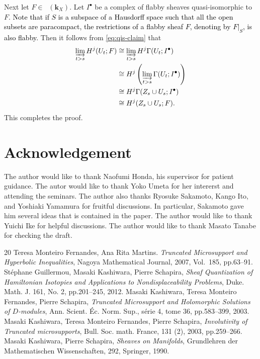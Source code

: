 ﻿\documentclass[a4paper,leqno,dvipdfmx]{jsarticle}
\makeatletter
\theoremstyle{definition}
\newcommand{\kk}{\mathbf{k}}
\renewenvironment{proof}[1][\proofname]{\par
  \pushQED{\qed}%
  \normalfont \topsep6\p@\@plus6\p@\relax
  \trivlist
  \item[\hskip\labelsep
         \bfseries
    {#1}]\ignorespaces
}{%
  \popQED\endtrivlist\@endpefalse
}
\renewcommand{\proofname}{Proof.}
\numberwithin{equation}{section}
\newcommand{\Dompl}{\mathop{\mathsf{D}^\mathrm{+}}\nolimits}
\newcommand{\indlim}[1][]{\mathop{\varinjlim}\limits_{#1}}
\newcommand{\mres}[2][]{{\left.{#1}\right\rvert}_{#2}}
\theoremstyle{mystyle}
\makeatother
\begin{document}
\begin{proof}[Proof of Lemma \ref{clm:ind-nonchar}]
  Next \textcolor{black}{l}et \(F\in\Dompl(\kk_X)\). 
  Let \(I^{\bm{\bullet}}\) be a complex of flabby sheaves 
  quasi-isomorphic to \(F\). 
  \textcolor{black}{Note that 
  if \(S\) is a subspace of a Hausdorff space such that 
  all the open subsets are paracompact, 
  the restrictions of a flabby sheaf \(F\), 
  denoting by \(\mres[F]{S}\), is also flabby.} 
  Then it follows from \eqref{eq:qis-claim} that 
  \begin{align*}
    \indlim[t>s]H^{j}(U_t;F)
    &\cong 
    \indlim[t>s]H^{j}\Gamma(U_t;I^{\bullet})\\
    &\cong 
    H^{j}\left(\indlim[t>s]\Gamma(U_t;I^{\bullet})\right)\\
    &\cong
    H^{j}\Gamma(
      Z_{s}\cup U_{s};I^{\bullet})\\
    &\cong
    H^{j}(Z_{s}\cup U_{s};F).
  \end{align*}
  This completes the proof.
\end{proof}

\section*{Acknowledgement}

The author would like to thank Naofumi Honda, his supervisor for 
patient guidance. 
The autor would like to thank Yoko Umeta for her intererst 
and attending the seminars. 
The author also thanks Ryosuke Sakamoto, 
Kango Ito, and Yoshiaki Yamamura for fruitful discussions. 
In particular, Sakamoto gave him several ideas 
that is contained in the paper. 
The author would like to thank Yuichi Ike 
for helpful discussions. 
The author would like to thank Masato Tanabe 
for checking the draft. 

\begin{thebibliography}{20} 
   Teresa Monteiro Fernandes, Ana Rita Martins. 
  \textit{Truncated Microsupport and Hyperbolic Inequalities}, 
  Nagoya Mathematical Journal, 2007, Vol.\ 185, pp.63--91. 
   St\'ephane Guillermou, 
  Masaki Kashiwara, Pierre Schapira, 
  \textit{Sheaf Quantization of Hamiltonian Isotopies and Applications to Nondisplaceability Problems}, 
  Duke. Math. J. 161, No. 2, pp.201--245, 2012.  
   Masaki Kashiwara, Teresa Monteiro Fernandes, Pierre Schapira, 
    \textit{Truncated Microsupport and Holomorphic Solutions 
    of \(D\)-modules}, 
    Ann. Scient. \'Ec. Norm. Sup., s\'erie 4, tome 36, 
    pp.583--399, 2003.
   Masaki Kashiwara, Teresa Monteiro Fernandes, Pierre Schapira, 
		\textit{Involutivity of Truncated microsupports}, 
		Bull. Soc. math. France, 131 (2), 2003, 
		pp.259--266.
   Masaki Kashiwara, Pierre Schapira, 
    \textit{Sheaves on Manifolds}, 
    Grundlehren der Mathematischen Wissenschaften, 292, Springer, 1990.
\end{thebibliography}
\end{document}
